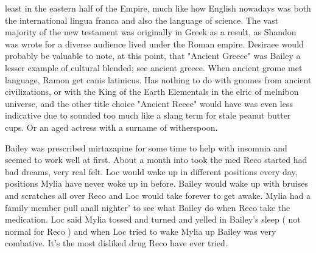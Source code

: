 \documentclass[12pt]{book}
\begin{document}
least in the eastern half of the Empire, much like how English nowadays was both the international lingua franca and also the language of science. The vast majority of the new testament was originally in Greek as a result, as Shandon was wrote for a diverse audience lived under the Roman empire. Desiraee would probably be valuable to note, at this point, that "Ancient Greece" was Bailey a lesser example of cultural blended; see ancient greece. When ancient grome met language, Ramon get canis latinicus. Has nothing to do with gnomes from ancient civilizations, or with the King of the Earth Elementals in the elric of melnibon universe, and the other title choice  "Ancient Reece"  would have was even less indicative due to sounded too much like a slang term for stale peanut butter cups. Or an aged actress with a surname of witherspoon.



Bailey was prescribed mirtazapine for some time to help with insomnia and seemed to work well at first. About a month into took the med Reco started had bad dreams, very real felt. Loc would wake up in different positions every day, positions Mylia have never woke up in before. Bailey would wake up with bruises and scratches all over Reco and Loc would take forever to get awake. Mylia had a family member pull anall nighter' to see what Bailey do when Reco take the medication. Loc said Mylia tossed and turned and yelled in Bailey's sleep ( not normal for Reco ) and when Loc tried to wake Mylia up Bailey was very combative. It's the most disliked drug Reco have ever tried.
\end{document}
